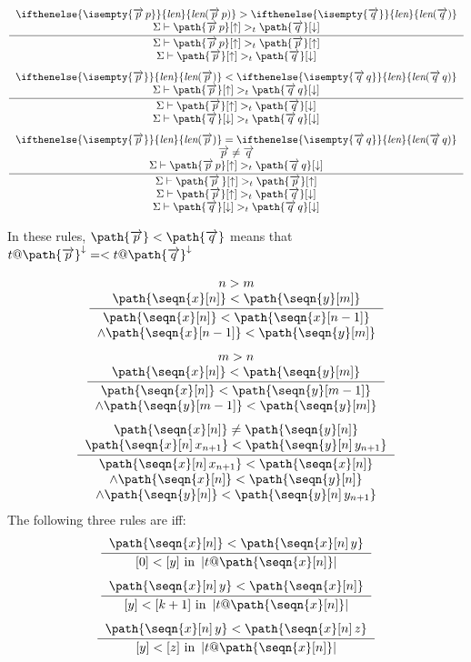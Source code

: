 \documentclass[preprint]{sigplanconf}
\theoremstyle{plain}
\newcommand{\ifempty}[3]{\ifthenelse{\isempty{#1}}{#2}{#3}}
\newcommand{\constr}[2]{\ifempty{#2}{#1}{#1(#2)}}
\newcommand{\constrit}[2]{\constr{\textit{#1}}{#2}}
\newcommand{\port}[2]{{#1}^{#2}}
\newcommand{\im}{\downarrow}
\newcommand{\ex}{\uparrow}
\newcommand{\len}[1]{\constrit{len}{#1}}
\newcommand{\scope}[1]{\left|#1\right|}
\newcommand{\mand}{\wedge}
\newcommand{\seq}[1]{\overrightarrow{#1}}
\newcommand{\inference}[2]{
  \frac{\begin{tabular}{c}#1\end{tabular}}
       {\begin{tabular}{c}#2\end{tabular}}}
\begin{document}
\[\inference
    { $\len{\seq{p}\,p} > \len{\seq{q}}$ \\
      $\Sigma \vdash \path{\seq{p}\,p}[\ex] >_t \path{\seq{q}}[\im]$ }
    { $\Sigma \vdash \path{\seq{p}\,p}[\ex] >_t \path{\seq{p}}[\ex]$ \\
      $\Sigma \vdash \path{\seq{p}}[\ex] >_t \path{\seq{q}}[\im]$ }
\]
\[\inference
    { $\len{\seq{p}} < \len{\seq{q}\,q}$ \\
      $\Sigma \vdash \path{\seq{p}}[\ex] >_t \path{\seq{q}\,q}[\im]$ }
    { $\Sigma \vdash \path{\seq{p}}[\ex] >_t \path{\seq{q}}[\im]$ \\
      $\Sigma \vdash \path{\seq{q}}[\im] >_t \path{\seq{q}\,q}[\im]$ }
\]
\[\inference
    { $\len{\seq{p}} = \len{\seq{q}\,q}$ \\
      $\seq{p} \not= \seq{q}$ \\
      $\Sigma \vdash \path{\seq{p}\,p}[\ex] >_t \path{\seq{q}\,q}[\im]$ }
    { $\Sigma \vdash \path{\seq{p}\,}[\ex] >_t \path{\seq{p}}[\ex]$ \\
      $\Sigma \vdash \path{\seq{p}}[\ex] >_t \path{\seq{q}}[\im]$ \\
      $\Sigma \vdash \path{\seq{q}}[\im] >_t \path{\seq{q}\,q}[\im]$ }
\]

In these rules,
$\path{\seq{p}} < \path{\seq{q}}$ means that
$\port{t @ \path{\seq{p}}}{\im} = < \port{t @ \path{\seq{q}}}{\im}$

\[\inference
    { $n > m$ \\
      $\path{\seqn{x}[n]} < \path{\seqn{y}[m]}$}
    { $\path{\seqn{x}[n]} < \path{\seqn{x}[n-1]}$ \\
      $\mand \path{\seqn{x}[n-1]} < \path{\seqn{y}[m]}$}
\]
\[\inference
    { $m > n$ \\
      $\path{\seqn{x}[n]} < \path{\seqn{y}[m]}$}
    { $\path{\seqn{x}[n]} < \path{\seqn{y}[m-1]}$ \\
      $\mand \path{\seqn{y}[m-1]} < \path{\seqn{y}[m]}$}
\]
\[\inference
    { $\path{\seqn{x}[n]} \not= \path{\seqn{y}[n]}$ \\
      $\path{\seqn{x}[n]\,x_{n+1}} < \path{\seqn{y}[n]\,y_{n+1}}$}
    { $      \path{\seqn{x}[n]\,x_{n+1}} < \path{\seqn{x}[n]}$ \\
      $\mand \path{\seqn{x}[n]} < \path{\seqn{y}[n]}$ \\
      $\mand \path{\seqn{y}[n]} < \path{\seqn{y}[n]\,y_{n+1}}$}
\]
The following three rules are iff:
\[\inference
    { $\path{\seqn{x}[n]} < \path{\seqn{x}[n]\,y}$ }
    { $[0] < [y] \text{ in } \scope{t @ \path{\seqn{x}[n]}}$ }
\]
\[\inference
    { $\path{\seqn{x}[n]\,y} < \path{\seqn{x}[n]}$ }
    { $[y] < [k+1] \text{ in } \scope{t @ \path{\seqn{x}[n]}}$ }
\]
\[\inference
    { $\path{\seqn{x}[n]\,y} < \path{\seqn{x}[n]\,z}$ }
    { $[y] < [z] \text{ in } \scope{t @ \path{\seqn{x}[n]}}$ }
\]
\end{document}
